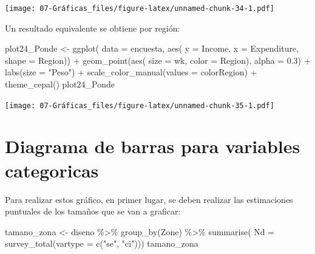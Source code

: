 \documentclass[
  12pt,
]{book}
\newenvironment{Shaded}{\begin{snugshade}}{\end{snugshade}}
\newcommand{\AttributeTok}[1]{\textcolor[rgb]{0.77,0.63,0.00}{#1}}
\newcommand{\FloatTok}[1]{\textcolor[rgb]{0.00,0.00,0.81}{#1}}
\newcommand{\FunctionTok}[1]{\textcolor[rgb]{0.00,0.00,0.00}{#1}}
\newcommand{\NormalTok}[1]{#1}
\newcommand{\OtherTok}[1]{\textcolor[rgb]{0.56,0.35,0.01}{#1}}
\newcommand{\SpecialCharTok}[1]{\textcolor[rgb]{0.00,0.00,0.00}{#1}}
\newcommand{\StringTok}[1]{\textcolor[rgb]{0.31,0.60,0.02}{#1}}
\begin{document}
\texttt{[image: 07-Gráficas\_files/figure-latex/unnamed-chunk-34-1.pdf]}

Un resultado equivalente se obtiene por región:

\begin{Shaded}
\begin{Highlighting}[]
\NormalTok{plot24\_Ponde }\OtherTok{\textless{}{-}} \FunctionTok{ggplot}\NormalTok{(}
  \AttributeTok{data =}\NormalTok{ encuesta,}
        \FunctionTok{aes}\NormalTok{(}
      \AttributeTok{y =}\NormalTok{ Income,}
      \AttributeTok{x =}\NormalTok{ Expenditure,}
      \AttributeTok{shape =}\NormalTok{ Region)) }\SpecialCharTok{+}
  \FunctionTok{geom\_point}\NormalTok{(}\FunctionTok{aes}\NormalTok{(}
    \AttributeTok{size =}\NormalTok{ wk,}
    \AttributeTok{color =}\NormalTok{ Region),}
  \AttributeTok{alpha =} \FloatTok{0.3}\NormalTok{) }\SpecialCharTok{+}
  \FunctionTok{labs}\NormalTok{(}\AttributeTok{size =} \StringTok{"Peso"}\NormalTok{) }\SpecialCharTok{+}
  \FunctionTok{scale\_color\_manual}\NormalTok{(}\AttributeTok{values =}\NormalTok{ colorRegion) }\SpecialCharTok{+}
  \FunctionTok{theme\_cepal}\NormalTok{()}
\NormalTok{plot24\_Ponde}
\end{Highlighting}
\end{Shaded}

\texttt{[image: 07-Gráficas\_files/figure-latex/unnamed-chunk-35-1.pdf]}

\hypertarget{diagrama-de-barras-para-variables-categoricas}{%
\section{Diagrama de barras para variables categoricas}\label{diagrama-de-barras-para-variables-categoricas}}

Para realizar estos gráfico, en primer lugar, se deben realizar las estimaciones puntuales de los tamaños que se van a graficar:

\begin{Shaded}
\begin{Highlighting}[]
\NormalTok{tamano\_zona }\OtherTok{\textless{}{-}}\NormalTok{ diseno }\SpecialCharTok{\%\textgreater{}\%}
  \FunctionTok{group\_by}\NormalTok{(Zone) }\SpecialCharTok{\%\textgreater{}\%}
  \FunctionTok{summarise}\NormalTok{( }\AttributeTok{Nd =} \FunctionTok{survey\_total}\NormalTok{(}\AttributeTok{vartype =} \FunctionTok{c}\NormalTok{(}\StringTok{"se"}\NormalTok{, }\StringTok{"ci"}\NormalTok{)))}
\NormalTok{tamano\_zona }
\end{Highlighting}
\end{Shaded}
\end{document}
